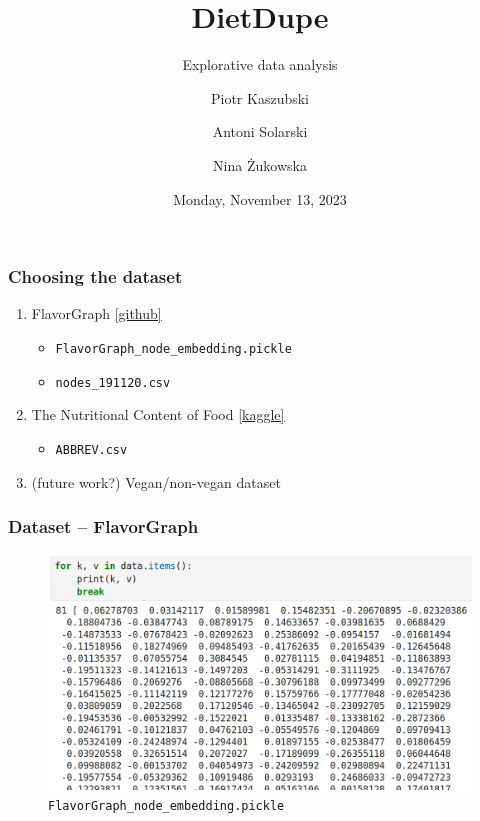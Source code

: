 \documentclass{beamer}
\title{DietDupe}
\subtitle{Explorative data analysis}
\author{Piotr Kaszubski \and Antoni Solarski \and Nina Żukowska}
\institute{Poznań University of Technology}
\date{Monday, November 13, 2023}
\begin{document}
\maketitle
\begin{frame}
	\frametitle{Choosing the dataset}
	\begin{enumerate}
		\item FlavorGraph \href{https://github.com/lamypark/FlavorGraph}{[github]}
			\begin{itemize}
				\item \texttt{FlavorGraph\_node\_embedding.pickle}
				\item \texttt{nodes\_191120.csv}
			\end{itemize}
		\item The Nutritional Content of Food \href{https://www.kaggle.com/datasets/thedevastator/the-nutritional-content-of-food-a-comprehensive}{[kaggle]}
			\begin{itemize}
				\item \texttt{ABBREV.csv}
			\end{itemize}
		\item (future work?) Vegan/non-vegan dataset
	\end{enumerate}
\end{frame}

\begin{frame}
	\frametitle{Dataset -- FlavorGraph}
	\begin{figure}[H]
		\centering
		\includegraphics[width=\linewidth]{img/embeddings_head.png}
		\caption{\texttt{FlavorGraph\_node\_embedding.pickle}}
	\end{figure}
\end{frame}
\end{document}
